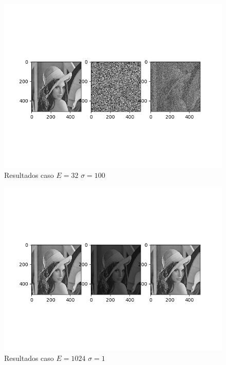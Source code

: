 \begin{figure}
\includegraphics[scale=0.9]{Imagenes/E32S100}
\centering
\caption{Resultados caso $E=32$ $\sigma = 100$ }
\end{figure}

\begin{figure}
\includegraphics[scale=0.9]{Imagenes/E1024S01}
\centering
\caption{Resultados caso $E=1024$ $\sigma = 1$ }
\end{figure}

